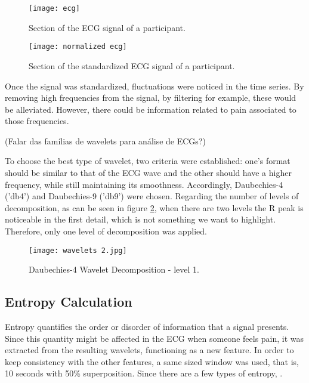 \begin{figure}[htbp]
    \centering
    \begin{minipage}{0.45\textwidth}
        \centering
        \texttt{[image: ecg]}
        \caption{Section of the ECG signal of a participant.}
        \label{fig:ecg}
    \end{minipage}
    \hfill
    \begin{minipage}{0.45\textwidth}
        \centering
        \texttt{[image: normalized ecg]}
        \caption{Section of the standardized ECG signal of a participant.}
        \label{fig:normalized_ecg}
    \end{minipage}
\end{figure}

Once the signal was standardized, fluctuations were noticed in the time series.
By removing high frequencies from the signal, by filtering for example, these would be alleviated.
However, there could be information related to pain associated to those frequencies.

(Falar das famílias de wavelets para análise de ECGs?)

To choose the best type of wavelet, two criteria were established: one's format should be similar to that of the ECG wave and the other should have a higher frequency, while still maintaining its smoothness.
Accordingly, Daubechies-4 ('db4') and Daubechies-9 ('db9') were chosen.
Regarding the number of levels of decomposition, as can be seen in figure \ref{fig:wavelets2}, when there are two levels the R peak is noticeable in the first detail, which is not something we want to highlight.
Therefore, only one level of decomposition was applied.

\begin{figure}[h!]
    \centering
    \texttt{[image: wavelets 2.jpg]}
    \caption{Daubechies-4 Wavelet Decomposition - level 1.}
    \label{fig:wavelets2}
\end{figure}


\subsection{Entropy Calculation}
Entropy quantifies the order or disorder of information that a signal presents.
Since this quantity might be affected in the ECG when someone feels pain, it was extracted from the resulting wavelets, functioning as a new feature.
In order to keep consistency with the other features, a same sized window was used, that is, 10 seconds with 50\% superposition.
Since there are a few types of entropy, .




